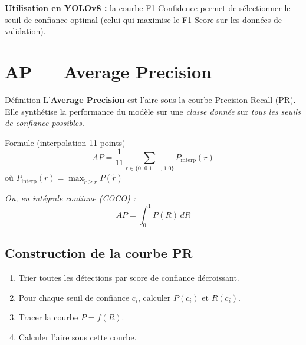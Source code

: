 \documentclass[12pt, a4paper]{report}
\begin{document}
\textbf{Utilisation en YOLOv8 :} la courbe F1-Confidence permet de sélectionner
le seuil de confiance optimal (celui qui maximise le F1-Score sur les données de
validation).

\section{AP — Average Precision}

\begin{definitionbox}{Définition}
  L'\textbf{Average Precision} est l'aire sous la courbe Precision-Recall (PR).
  Elle synthétise la performance du modèle sur une \emph{classe donnée} sur
  \emph{tous les seuils de confiance possibles}.
\end{definitionbox}

\begin{formulebox}{Formule (interpolation 11 points)}
  \[
    AP = \frac{1}{11} \sum_{r \in \{0,\,0.1,\,\ldots,\,1.0\}} P_{\text{interp}}(r)
  \]
  où $P_{\text{interp}}(r) = \max_{\tilde{r} \geq r} P(\tilde{r})$

  \textit{Ou, en intégrale continue (COCO) :}
  \[
    AP = \int_0^1 P(R)\, dR
  \]
\end{formulebox}

\subsection{Construction de la courbe PR}

\begin{enumerate}
  \item Trier toutes les détections par score de confiance décroissant.
  \item Pour chaque seuil de confiance $c_i$, calculer $P(c_i)$ et $R(c_i)$.
  \item Tracer la courbe $P = f(R)$.
  \item Calculer l'aire sous cette courbe.
\end{enumerate}
\end{document}
